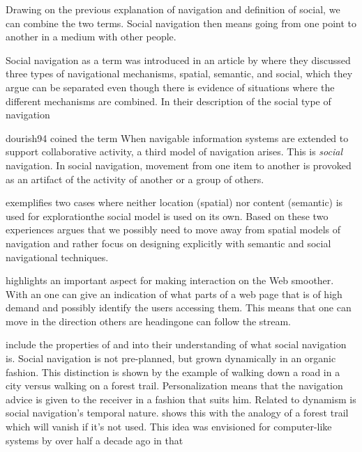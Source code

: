 Drawing on the previous explanation of navigation and definition of social, we
can combine the two terms. Social navigation then means going from one point
to another in a medium with other people.

Social navigation as a term was introduced in an article by
\citet{dourish94} where they discussed three types of navigational mechanisms,
spatial, semantic,%
and social, which they argue can be separated even though
there is evidence of situations where the different mechanisms are combined.
In their description of the social type of navigation
\begin{fullquote}[\p{1}]{dourish94}{%
  coined the term }
    When navigable information systems are extended to support collaborative
    activity, a third model of navigation arises. This is \emph{social}
    navigation. In social navigation, movement from one item to another is
    provoked as an artifact of the activity of another or a group of others.
\end{fullquote}

\citeauthor{dourish94} exemplifies two cases where neither location
(spatial) nor content (semantic) is used for exploration\dash{}the social
model is used on its own. Based on these two experiences
\citeauthor{dourish94} argues that we possibly need to move away from spatial
models of navigation and rather focus on designing explicitly with semantic
and social navigational techniques.

\citeauthor{dieberger97} highlights an important aspect for making interaction
on the Web smoother. With an
one can give an indication of what parts of a web page that is of high demand
and possibly identify the users accessing them. This means that one can move
in the direction others are heading\dash{}one can follow the stream.

\citet[]{dieberger00b} include the properties of 
and  into their understanding of what social navigation is.
Social navigation is not pre-planned, but grown dynamically in an organic
fashion. This distinction is shown by the example of walking down a road in a
city versus walking on a forest trail. Personalization means that the
navigation advice is given to the receiver in a fashion that suits him.
Related to dynamism is social navigation's temporal nature.
\citet[]{dieberger00b} shows this with the analogy of a forest trail
which will vanish if it's not used. This idea was envisioned for computer-like
systems by \citeauthor{bush45} over half a decade ago in that

